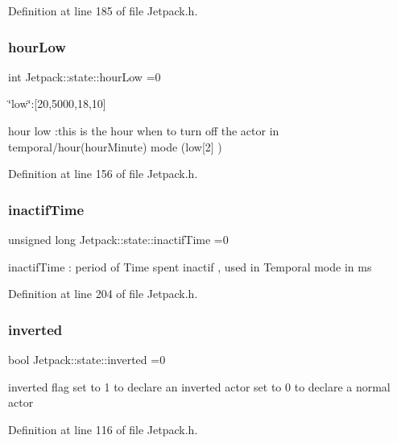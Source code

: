 Definition at line 185 of file Jetpack.\+h.

\mbox{\label{struct_jetpack_1_1state_a9bd1b9e85800cfbec989ce40d1e9e08a}} 
\subsubsection{\texorpdfstring{hour\+Low}{hourLow}}
{\footnotesize\ttfamily int Jetpack\+::state\+::hour\+Low =0}

\char`\"{}low\char`\"{}\+:\mbox{[}20,5000,18,10\mbox{]}

hour low \+:this is the hour when to turn off the actor in temporal/hour(hour\+Minute) mode (low\mbox{[}2\mbox{]} ) 

Definition at line 156 of file Jetpack.\+h.

\mbox{\label{struct_jetpack_1_1state_aaf817b1f9e7a4d65b9e3ca4726b281f6}} 
\subsubsection{\texorpdfstring{inactif\+Time}{inactifTime}}
{\footnotesize\ttfamily unsigned long Jetpack\+::state\+::inactif\+Time =0}

inactif\+Time \+: period of Time spent inactif , used in Temporal mode in ms 

Definition at line 204 of file Jetpack.\+h.

\mbox{\label{struct_jetpack_1_1state_a6bc03bb8f05b10aa142dbb0c39c87fb5}} 
\subsubsection{\texorpdfstring{inverted}{inverted}}
{\footnotesize\ttfamily bool Jetpack\+::state\+::inverted =0}

inverted flag set to 1 to declare an inverted actor set to 0 to declare a normal actor 

Definition at line 116 of file Jetpack.\+h.


